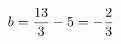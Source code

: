 \documentclass[preview]{standalone}
\begin{document}
\begin{align*}
\special{dvisvgm:raw <g id='unique000'>}b=\dfrac{13}{3}-5=-\dfrac{2}{3}\special{dvisvgm:raw </g>}
\end{align*}
\end{document}
